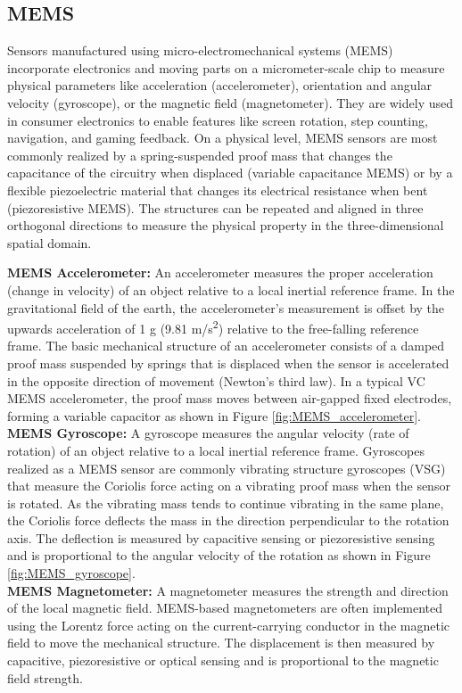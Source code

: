 \documentclass[sigconf, nonacm]{acmart}
\begin{document}
\subsection{MEMS}
\begin{sloppypar}
Sensors manufactured using micro-electromechanical systems (MEMS) incorporate electronics and moving parts on a micrometer-scale chip to measure physical parameters like acceleration (accelerometer), orientation and angular velocity (gyroscope), or the magnetic field (magnetometer).
They are widely used in consumer electronics to enable features like screen rotation, step counting, navigation, and gaming feedback.
On a physical level, MEMS sensors are most commonly realized by a spring-suspended proof mass that changes the capacitance of the circuitry when displaced (variable capacitance MEMS) or by a flexible piezoelectric material that changes its electrical resistance when bent (piezoresistive MEMS).
The structures can be repeated and aligned in three orthogonal directions to measure the physical property in the three-dimensional spatial domain.
\vspace{0.25cm}
\end{sloppypar}
\noindent
\textbf{MEMS Accelerometer:} An accelerometer measures the proper acceleration (change in velocity) of an object relative to a local inertial reference frame.
In the gravitational field of the earth, the accelerometer's measurement is offset by the upwards acceleration of 1 g (9.81 m/s\textsuperscript{2}) relative to the free-falling reference frame.
The basic mechanical structure of an accelerometer consists of a damped proof mass suspended by springs that is displaced when the sensor is accelerated in the opposite direction of movement (Newton's third law).
In a typical VC MEMS accelerometer, the proof mass moves between air-gapped fixed electrodes, forming a variable capacitor as shown in Figure \ref{fig:MEMS_accelerometer}.
\\[6pt]
\textbf{MEMS Gyroscope:} A gyroscope measures the angular velocity (rate of rotation) of an object relative to a local inertial reference frame.
Gyroscopes realized as a MEMS sensor are commonly vibrating structure gyroscopes (VSG) that measure the Coriolis force acting on a vibrating proof mass when the sensor is rotated.
As the vibrating mass tends to continue vibrating in the same plane, the Coriolis force deflects the mass in the direction perpendicular to the rotation axis.
The deflection is measured by capacitive sensing or piezoresistive sensing and is proportional to the angular velocity of the rotation as shown in Figure \ref{fig:MEMS_gyroscope}.
\\[6pt]
\textbf{MEMS Magnetometer:} A magnetometer measures the strength and direction of the local magnetic field.
MEMS-based magnetometers are often implemented using the Lorentz force acting on the current-carrying conductor in the magnetic field to move the mechanical structure.
The displacement is then measured by capacitive, piezoresistive or optical sensing and is proportional to the magnetic field strength.
\end{document}
